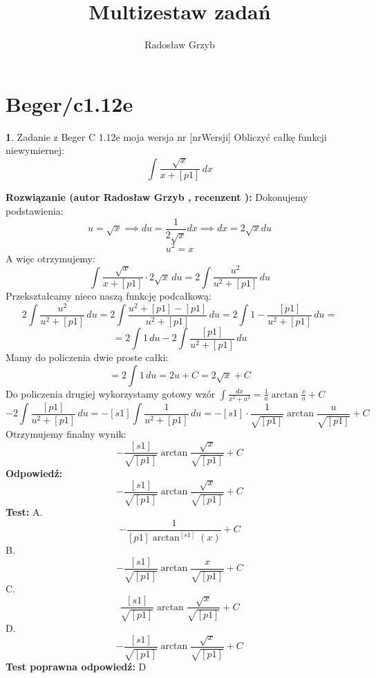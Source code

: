 \documentclass[12pt, a4paper]{article}
\title{Multizestaw zadań}
\author{Radosław Grzyb}
\date{}
\theoremstyle{definition} %
\newtheorem{zad}{}
\newcommand{\kategoria}[1]{\section{#1}} %
\newcommand{\zadStart}[1]{\begin{zad}#1\newline} %
\newcommand{\zadStop}{\end{zad}}   %
\newcommand{\rozwStart}[2]{\noindent \textbf{Rozwiązanie (autor #1 , recenzent #2): }\newline} %
\newcommand{\rozwStop}{\newline}                                            %
\newcommand{\odpStart}{\noindent \textbf{Odpowiedź:}\newline}    %
\newcommand{\odpStop}{\newline}                                             %
\newcommand{\testStart}{\noindent \textbf{Test:}\newline} %
\newcommand{\testStop}{\newline} %
\newcommand{\kluczStart}{\noindent \textbf{Test poprawna odpowiedź:}\newline} %
\newcommand{\kluczStop}{\newline} %
\begin{document}
\maketitle
\kategoria{Beger/c1.12e}
\zadStart{Zadanie z Beger C 1.12e moja wersja nr [nrWersji]}
Obliczyć całkę funkcji niewymiernej:
$$\int \frac{\sqrt{x}}{x+[p1]}\,dx$$
\zadStop
\rozwStart{Radosław Grzyb}{}
Dokonujemy podstawienia:
$$u=\sqrt{x}\implies du=\frac{1}{2\sqrt{x}}dx\implies dx=2\sqrt{x} du$$
$$u^2=x$$
A więc otrzymujemy:
$$\int \frac{\sqrt{x}}{x+[p1]}\cdot2\sqrt{x} \,du=2\int \frac{u^2}{u^2+[p1]}\,du$$
Przekształcamy nieco naszą funkcję podcałkową:
$$2\int \frac{u^2}{u^2+[p1]}\,du=2\int \frac{u^2+[p1]-[p1]}{u^2+[p1]}\,du=2\int1-\frac{[p1]}{u^2+[p1]}\,du=$$
$$=2\int1\,du-2\int\frac{[p1]}{u^2+[p1]}\,du$$
Mamy do policzenia dwie proste całki:
$$=2\int1\,du=2u+C=2\sqrt{x}+C$$
Do policzenia drugiej wykorzystamy gotowy wzór $\int\frac{dx}{x^2+a^2}=\frac{1}{a}\arctan\frac{x}{a}+C$
$$-2\int\frac{[p1]}{u^2+[p1]}\,du=-[s1]\int\frac{1}{u^2+[p1]}\,du=-[s1]\cdot\frac{1}{\sqrt{[p1]}}\arctan\frac{u}{\sqrt{[p1]}}+C$$
Otrzymujemy finalny wynik:
$$-\frac{[s1]}{\sqrt{[p1]}}\arctan\frac{\sqrt{x}}{\sqrt{[p1]}}+C$$
\rozwStop
\odpStart
$$-\frac{[s1]}{\sqrt{[p1]}}\arctan\frac{\sqrt{x}}{\sqrt{[p1]}}+C$$
\odpStop
\testStart
A.$$-\frac{1}{[p1]\arctan^{[s1]}(x)}+C$$
B.$$-\frac{[s1]}{\sqrt{[p1]}}\arctan\frac{x}{\sqrt{[p1]}}+C$$
C.$$\frac{[s1]}{\sqrt{[p1]}}\arctan\frac{\sqrt{x}}{\sqrt{[p1]}}+C$$
D.$$-\frac{[s1]}{\sqrt{[p1]}}\arctan\frac{\sqrt{x}}{\sqrt{[p1]}}+C$$
\testStop
\kluczStart
D
\kluczStop
\end{document}
